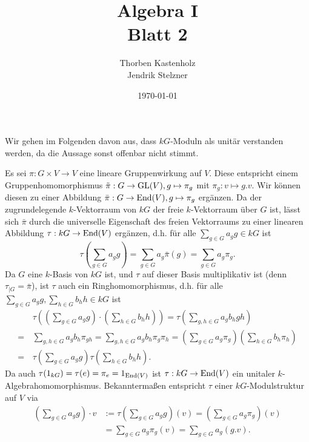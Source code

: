 \documentclass[a4paper,10pt]{article}
\title{\sc Algebra I \\ \Large Blatt 2}
\author{Thorben Kastenholz \\ Jendrik Stelzner}
\date{\today}
\begin{document}
\maketitle





\section{}
Wir gehen im Folgenden davon aus, dass $kG$-Moduln als unitär verstanden werden, da die Aussage sonst offenbar nicht stimmt.

Es sei $\pi : G \times V \to V$ eine lineare Gruppenwirkung auf $V$. Diese entspricht einem Gruppenhomomorphismus $\tilde{\pi} : G \to \operatorname{GL}(V), g \mapsto \pi_g$ mit $\pi_g : v \mapsto g.v$. Wir können diesen zu einer Abbildung $\bar{\pi} : G \to \operatorname{End}(V), g \mapsto \pi_g$ ergänzen. Da der zugrundelegende $k$-Vektorraum von $kG$ der freie $k$-Vektorraum über $G$ ist, lässt sich $\bar{\pi}$ durch die universelle Eigenschaft des freien Vektorraums zu einer linearen Abbildung $\tau : kG \to \operatorname{End}(V)$ ergänzen, d.h. für alle $\sum_{g \in G} a_g g \in kG$ ist
\[
 \tau\left( \sum_{g\in G} a_g g\right) = \sum_{g \in G} a_g \bar{\pi}(g) = \sum_{g \in G} a_g \pi_g.
\]
Da $G$ eine $k$-Basis von $kG$ ist, und $\tau$ auf dieser Basis multiplikativ ist (denn $\tau_{|G} = \bar{\pi}$), ist $\tau$ auch ein Ringhomomorphismus, d.h. für alle $\sum_{g \in G} a_g g, \sum_{h \in G} b_h h \in kG$ ist
\begin{align*}
 &\, \tau\left( \left(\sum_{g \in G} a_g g\right) \cdot \left(\sum_{h \in G} b_h h\right) \right)
 = \tau\left( \sum_{g, h \in G} a_g b_h g h \right) \\
 =&\, \sum_{g,h \in G} a_g b_h \pi_{g h}
 = \sum_{g,h \in G} a_g b_h \pi_g \pi_h
 = \left(\sum_{g \in G} a_g \pi_g\right) \left(\sum_{h \in G} b_h \pi_h\right) \\
 =&\, \tau\left(\sum_{g \in G} a_g g\right) \tau\left(\sum_{h \in G} b_h h\right).
\end{align*}
Da auch $\tau(1_{kG}) = \tau(e) = \pi_e = 1_{\operatorname{End}(V)}$ ist $\tau : kG \to \operatorname{End}(V)$ ein unitaler $k$-Algebrahomomorphismus. Bekanntermaßen entspricht $\tau$ einer $kG$-Modulstruktur auf $V$ via
\begin{align*}
 \left(\sum_{g \in G} a_g g\right) \cdot v
 &:= \tau\left(\sum_{g \in G} a_g g\right)(v)
 = \left(\sum_{g \in G} a_g \pi_g\right)(v) \\
 &= \sum_{g \in G} a_g \pi_g(v)
 = \sum_{g \in G} a_g (g.v).
\end{align*}
\end{document}
